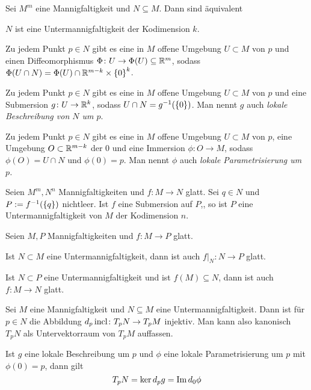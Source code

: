 \begin{satz}
  Sei $M^m$ eine Mannigfaltigkeit und $N\subseteq M$. Dann sind äquivalent
  \begin{statements}
  \item $N$ ist eine Untermannigfaltigkeit der Kodimension $k$.
  \item Zu jedem Punkt $p\in N$ gibt es eine in $M$ offene Umgebung
    $U\subset M$ von $p$ und einen Diffeomorphismus $\Phi\colon U \to
    \Phi(U) \subseteq \mathbb{R}^m$, sodass $\Phi(U\cap N) = \Phi(U)\cap
    \mathbb{R}^{m-k}\times\left\lbrace 0 \right\rbrace^k$.
  \item Zu jedem Punkt $p\in N$ gibt es eine in $M$ offene Umgebung
    $U\subset M$ von $p$ und eine Submersion $g\colon U \to \mathbb{R}^k$,
    sodass $U\cap N = g^{-1}(\left\lbrace 0 \right\rbrace)$. Man nennt $g$ auch
    \emph{lokale Beschreibung von $N$ um $p$}.
  \item Zu jedem Punkt $p\in N$ gibt es eine in $M$ offene Umgebung
    $U\subset M$ von $p$, eine Umgebung $O\subset \mathbb{R}^{m-k}$ der $0$
    und eine Immersion $\phi\colon O \to M$,
    sodass $\phi(O) = U\cap N$ und $\phi(0) = p$. Man nennt $\phi$
    auch \emph{lokale Parametrisierung um $p$.}
  \end{statements}
\end{satz}

\begin{proposition}
  Seien $M^m,N^n$ Mannigfaltigkeiten und $f\colon M \to N$ glatt. Sei
  $q\in N$ und $P := f^{-1}(\left\lbrace q \right\rbrace)$ nichtleer. Ist $f$ eine
  Submersion auf $P$,, so ist $P$ eine Untermannigfaltigkeit von $M$
  der Kodimension $n$.
\end{proposition}

\begin{proposition}
  Seien $M,P$ Mannigfaltigkeiten und $f\colon M\to P$ glatt.
  \begin{statements}
  \item Ist $N\subset M$ eine Untermannigfaltigkeit, dann ist auch
    $f|_N\colon N \to P$ glatt.
  \item Ist $N\subset P$ eine Untermannigfaltigkeit und ist
    $f(M)\subseteq N$, dann ist auch
    $f\colon M \to N$ glatt.
  \end{statements}
\end{proposition}

\begin{proposition}
  Sei $M$ eine Mannigfaltigkeit und $N\subseteq M$ eine
  Untermannigfaltigkeit. Dann ist für $p\in N$ die Abbildung $d_p\operatorname{incl}
  \colon T_pN \to T_pM$ injektiv. Man kann also kanonisch $T_pN$ als
  Untervektorraum von $T_pM$ auffassen.

  Ist $g$ eine lokale Beschreibung um $p$ und $\phi$ eine lokale
  Parametrisierung um $p$ mit $\phi(0) = p$, dann gilt
  \begin{equation*}
    T_pN = \ker d_p g = \operatorname{Im} d_0\phi
  \end{equation*}
\end{proposition}

